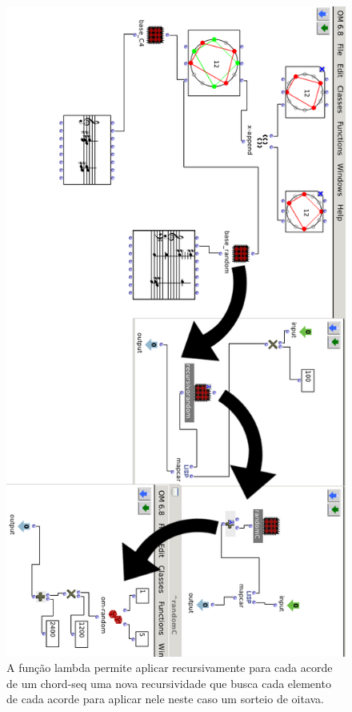\documentclass[
	12pt,				%
	openright,			%
	twoside,			%
	a4paper,			%
	english,			%
	french,				%
	spanish,			%
	brazil				%
	]{abntex2}
\begin{document}
\begin{figure}[!h]
	\caption{\label{fig_grafico}A função lambda permite aplicar recursivamente para cada acorde de um chord-seq uma nova recursividade que busca cada elemento de cada acorde para aplicar nele neste caso um sorteio de oitava. }
	\begin{center}
	    \includegraphics[scale=0.5]{OMPD/Lambda_randomOitavas.png}
	\end{center}
\end{figure}
\end{document}
